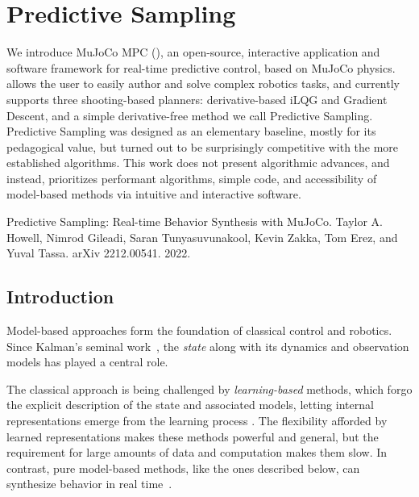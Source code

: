 \chapter{Predictive Sampling}
We introduce MuJoCo MPC (\app{}), an open-source, interactive application and software framework for real-time predictive control, based on MuJoCo physics. \app{} allows the user to easily author and solve complex robotics tasks, and currently supports three shooting-based planners: derivative-based iLQG and Gradient Descent, and a simple derivative-free method we call Predictive Sampling. Predictive Sampling was designed as an elementary baseline, mostly for its pedagogical value, but turned out to be surprisingly competitive with the more established algorithms. This work does not present algorithmic advances, and instead, prioritizes performant algorithms, simple code, and accessibility of model-based methods via intuitive and interactive software. 


\vspace*{\fill}

\noindent Predictive Sampling: Real-time Behavior Synthesis with MuJoCo. Taylor A. Howell, Nimrod Gileadi, Saran Tunyasuvunakool, Kevin Zakka, Tom Erez, and Yuval Tassa. arXiv 2212.00541. 2022.

\pagebreak

\section{Introduction}

Model-based approaches form the foundation of classical control and robotics. Since Kalman's seminal work~\cite{kalman1960general}, the \emph{state} along with its dynamics and observation models has played a central role. 

The classical approach is being challenged by \textit{learning-based} methods, which forgo the explicit description of the state and associated models, letting internal representations emerge from the learning process \cite{lillicrap2015continuous, schulman2017proximal, salimans2017evolution, smith2022walk, rudin2022learning}. The flexibility afforded by learned representations makes these methods powerful and general, but the requirement for large amounts of data and computation makes them slow. In contrast, pure model-based methods, like the ones described below, can synthesize behavior in real time~\cite{tassa2014control}.

